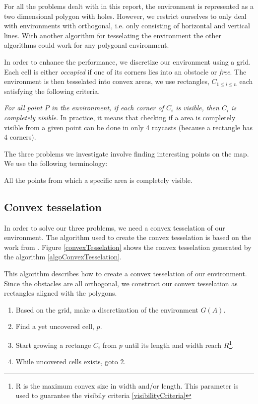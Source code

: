 For all the problems dealt with in this report, the environment is represented as a two dimensional polygon with holes. However, we restrict ourselves to only deal with environments with orthogonal, i.e. only consisting of horizontal and vertical lines. With another algorithm for tesselating the environment the other algorithms could work for any polygonal environment.

In order to enhance the performance, we discretize our environment using a grid. Each cell is either \emph{occupied} if one of its corners lies into an obstacle or \emph{free}.
The environment is then tesselated into convex areas, we use rectangles, $C_{1\leq i \leq n}$ each satisfying the following criteria.

\begin{criteria}[of Visibility]
 \emph{For all point $P$ in the environment, if each corner of $C_i$ is visible, then $C_i$ is completely visible}. In practice, it means that checking if a area is completely visible from a given point can be done in only 4 raycasts (because a rectangle has 4 corners).
\label{visibilityCriteria}
\end{criteria}


The three problems we investigate involve finding interesting points on the map. We use the following terminology:
\begin{definition}
All the points from which a specific area is completely visible.
\end{definition}

\subsection{Convex tesselation}

In order to solve our three problems, we need a convex tesselation of our environment. The algorithm used to create the convex tesselation is based on the work from \cite{CoopMinTime}. Figure \ref{convexTesselation} shows the convex tesselation generated by the algorithm \ref{algoConvexTesselation}.

\begin{algorithm}
This algorithm describes how to create a convex tesselation of our environment. Since the obstacles are all orthogonal, we construct our convex tesselation as rectangles aligned with the polygons.
\begin{enumerate}
\item Based on the grid, make a discretization of the environment $G(A)$.
\item Find a yet uncovered cell, $p$.
\item Start growing a rectange $C_i$ from $p$ until its length and width reach $R$\footnote{R is the maximum convex size in width and/or length. This parameter is used to guarantee the visibily criteria \ref{visibilityCriteria}}.
\item While uncovered cells exists, goto 2.
\end{enumerate}
\label{algoConvexTesselation}
\end{algorithm}

